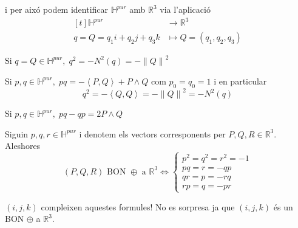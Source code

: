 \documentclass[../main.tex]{subfiles}
\begin{document}
	i per aixó podem identificar $\mathbb{H}^{pur}$ amb $\mathbb{R}^3$ via l'aplicació
	\begin{displaymath}
		\begin{aligned}[t]
			\mathbb{H}^{pur} &\to \mathbb{R}^3\\
			q = Q = q_1i + q_2j + q_3k &\mapsto Q = (q_1, q_2, q_3)
		\end{aligned}
	\end{displaymath}
	\begin{proposicio}
		Si $q = Q \in \mathbb{H}^{pur},\; q^2 = -N^2(q) = -\left\lVert Q \right\rVert^2$
	\end{proposicio}
	\begin{demostracio}
		Si $p, q \in \mathbb{H}^{pur},\; pq = -\left\langle P, Q \right\rangle + P\wedge Q$ com $p_0 = q_0 = 1$ i en particular
		\begin{displaymath}
			q^2 = -\left\langle Q, Q \right\rangle = -\left\lVert Q \right\rVert^2 = - N^2(q)
		\end{displaymath}
	\end{demostracio}
	\begin{obs}
		Si $p,q \in \mathbb{H}^{pur},\; pq-qp = 2 P\wedge Q$
	\end{obs}
	\begin{teorema}
		Siguin $p, q, r \in \mathbb{H}^{pur}$ i denotem els vectors corresponents per $P, Q, R \in \mathbb{R}^3$. Aleshores
		\begin{displaymath}
			(P, Q, R) \text{ BON } \oplus \text{ a } \mathbb{R}^3 \Leftrightarrow \begin{cases}
				p^2 = q^2 = r^2 = -1\\
				pq = r = -qp\\
				qr = p = -rq\\
				rp = q = -pr
				\end{cases}
		\end{displaymath}
	\end{teorema}
	\begin{obs}
		$(i, j, k)$ compleixen aquestes formules! No es sorpresa ja que $(i, j, k)$ és un BON $\oplus$ a $\mathbb{R}^3$.
	\end{obs}
\end{document}
